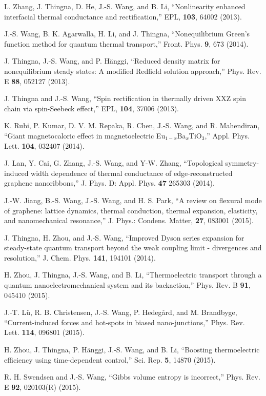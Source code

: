 \itm L. Zhang, J. Thingna, D. He, J.-S. Wang, and B. Li, 
``Nonlinearity enhanced interfacial thermal conductance and rectification,'' 
EPL, {\bf 103}, 64002 (2013). 

\itm J.-S. Wang, B. K. Agarwalla, H. Li, and J. Thingna, ``Nonequilibrium 
Green's function method for quantum thermal transport,'' Front. Phys.
{\bf 9}, 673 (2014). 

\itm J. Thingna, J.-S. Wang, and P. H\"anggi, 
``Reduced density matrix for nonequilibrium steady states: A modified 
Redfield solution approach,'' Phys. Rev. E {\bf 88}, 052127 (2013). 

\itm J. Thingna and J.-S. Wang, ``Spin rectification in thermally driven XXZ 
spin chain via spin-Seebeck effect,'' EPL, {\bf 104}, 37006 (2013).  
 
\itm K. Rubi, P. Kumar, D. V. M. Repaka, R. Chen, J.-S. Wang, and 
R. Mahendiran, ``Giant magnetocaloric effect in magnetoelectric 
Eu$_{1-x}$Ba$_{x}$TiO$_{3}$,'' Appl. Phys. Lett. {\bf 104}, 032407 (2014). 

\itm J. Lan, Y. Cai, G. Zhang, J.-S. Wang, and Y-W. Zhang, 
``Topological symmetry-induced width dependence of thermal conductance of 
edge-reconstructed graphene nanoribbons,'' 
J. Phys. D: Appl. Phys. {\bf 47} 265303 (2014). 

\itm J.-W. Jiang, B.-S. Wang, J.-S. Wang, and H. S. Park, 
``A review on flexural mode of graphene: lattice dynamics, thermal 
conduction, thermal expansion, elasticity, and nanomechanical resonance,'' 
J. Phys.: Condens. Matter, {\bf 27}, 083001 (2015). 

\itm J. Thingna, H. Zhou, and J.-S. Wang, 
``Improved Dyson series expansion for steady-state quantum transport beyond 
the weak coupling limit - divergences and resolution,'' 
J. Chem. Phys. {\bf 141}, 194101 (2014). 

\itm H. Zhou, J. Thingna, J.-S. Wang, and B. Li, 
``Thermoelectric transport through a quantum nanoelectromechanical system 
and its backaction,'' 
Phys. Rev. B {\bf 91}, 045410 (2015). 

\itm J.-T. L\"u, R. B. Christensen, J.-S. Wang, P. Hedeg\aa rd, and M. Brandbyge, ``Current-induced forces and hot-spots in biased nano-junctions,'' Phys. Rev. Lett. {\bf 114}, 096801 (2015). 

\itm H. Zhou, J. Thingna, P. H\"anggi, J.-S. Wang, and B. Li, ``Boosting thermoelectric efficiency using time-dependent control,'' Sci. Rep. {\bf 5}, 14870 (2015). 

\itm R. H. Swendsen and J.-S. Wang, ``Gibbs volume entropy is incorrect,'' Phys. Rev. E {\bf 92}, 020103(R) (2015). 

